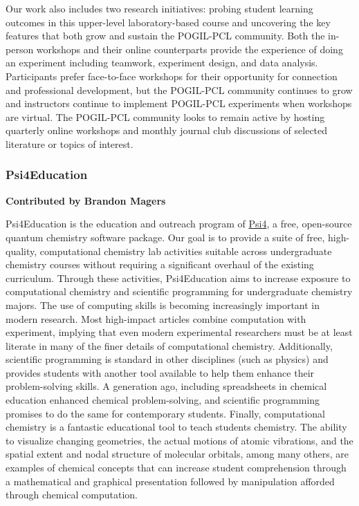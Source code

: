 \documentclass[9pt,review]{livecoms}
\begin{document}
Our work also includes two research initiatives: probing student learning outcomes in this upper-level laboratory-based course and uncovering the key features that both grow and sustain the POGIL-PCL community. Both the in-person workshops and their online counterparts provide the experience of doing an experiment including teamwork, experiment design, and data analysis. Participants prefer face-to-face workshops for their opportunity for connection and professional development, but the POGIL-PCL community continues to grow and instructors continue to implement POGIL-PCL experiments when workshops are virtual. The POGIL-PCL community looks to remain active by hosting quarterly online workshops and monthly journal club discussions of selected literature or topics of interest.



\subsubsection{Psi4Education}

\textbf{Contributed by Brandon Magers}

Psi4Education is the education and outreach program of \href{psicode.org}{Psi4}, 
a free, open-source quantum chemistry software package.  Our goal is to provide a suite of free, high-quality, computational chemistry lab activities suitable across undergraduate chemistry courses without requiring a significant overhaul of the existing curriculum. 
Through these activities, Psi4Education aims to increase exposure to computational chemistry and scientific programming for undergraduate chemistry majors.  
The use of computing skills is becoming increasingly important in modern research. 
Most high-impact articles combine computation with experiment, implying that even modern experimental researchers must be at least literate in many of the finer details of computational chemistry. 
Additionally, scientific programming is standard in other disciplines (such as physics) and provides students with another tool available to help them enhance their problem-solving skills. 
A generation ago, including spreadsheets in chemical education enhanced chemical problem-solving, and scientific programming promises to do the same for contemporary students. 
Finally, computational chemistry is a fantastic educational tool to teach students chemistry. 
The ability to visualize changing geometries, the actual motions of atomic vibrations, and the spatial extent and nodal structure of molecular orbitals, among many others, are examples of chemical concepts that can increase student comprehension through a mathematical and graphical presentation followed by manipulation afforded through chemical computation.
\end{document}
